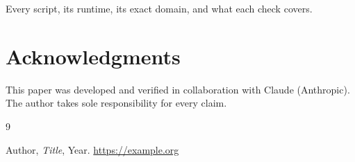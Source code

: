 \documentclass[11pt]{amsart}
\theoremstyle{definition}
\theoremstyle{remark}
\begin{document}
Every script, its runtime, its exact domain, and what each check covers.

\section*{Acknowledgments}

This paper was developed and verified in collaboration with Claude (Anthropic). The author takes sole responsibility for every claim.

\begin{thebibliography}{9}

Author, \emph{Title}, Year. \url{https://example.org}

\end{thebibliography}
\end{document}
